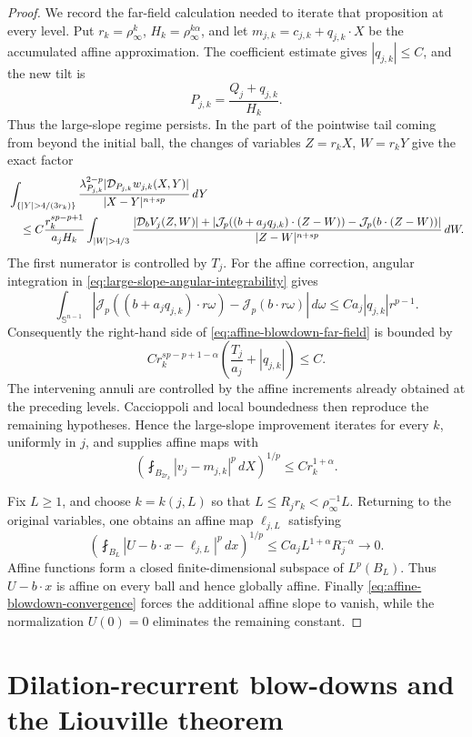 \documentclass[11pt,reqno]{amsart}
\numberwithin{equation}{section}
\newcommand{\Jp}{\mathcal J_p}
\newcommand{\dd}{\,d}
\theoremstyle{remark}
\begin{document}
\begin{proof}
We record the far-field calculation needed to iterate that proposition
at every level.  Put \(r_k=\rho_\infty^k\),
\(H_k=\rho_\infty^{k\alpha}\), and let
\(m_{j,k}=c_{j,k}+q_{j,k}\cdot X\) be the accumulated affine
approximation.  The coefficient estimate gives \(|q_{j,k}|\le C\), and
the new tilt is
\[
 P_{j,k}=\frac{Q_j+q_{j,k}}{H_k}.
\]
Thus the large-slope regime persists.  In the part of the pointwise tail
coming from beyond the initial ball, the changes of variables
\(Z=r_kX\), \(W=r_kY\) give the exact factor
\begin{align}
 &\int_{\{|Y|>4/(3r_k)\}}
 \frac{\lambda_{P_{j,k}}^{2-p}
 |\mathcal D_{P_{j,k}}w_{j,k}(X,Y)|}
 {|X-Y|^{n+sp}}\dd Y\notag\\
 &\quad\le
 C\frac{r_k^{sp-p+1}}{a_jH_k}
 \int_{|W|>4/3}
 \frac{|\mathcal D_bV_j(Z,W)|
 +|\Jp((b+a_jq_{j,k})\cdot(Z-W))
       -\Jp(b\cdot(Z-W))|}
 {|Z-W|^{n+sp}}\dd W.
 \label{eq:affine-blowdown-far-field}
\end{align}
The first numerator is controlled by \(T_j\).  For the affine correction,
angular integration in
\eqref{eq:large-slope-angular-integrability} gives
\[
 \int_{\mathbb S^{n-1}}
 |\Jp((b+a_jq_{j,k})\cdot r\omega)
 -\Jp(b\cdot r\omega)|\dd\omega
 \le Ca_j|q_{j,k}|r^{p-1}.
\]
Consequently the right-hand side of
\eqref{eq:affine-blowdown-far-field} is bounded by
\[
 Cr_k^{sp-p+1-\alpha}
 \left(\frac{T_j}{a_j}+|q_{j,k}|\right)\le C.
\]
The intervening annuli are controlled by the affine increments already
obtained at the preceding levels.  Caccioppoli and local boundedness then
reproduce the remaining hypotheses.  Hence the large-slope improvement
iterates for every \(k\), uniformly in \(j\), and supplies affine maps
with
\[
 \left(\fint_{B_{2r_k}}|v_j-m_{j,k}|^p\dd X\right)^{1/p}
 \le Cr_k^{1+\alpha}.
\]

Fix \(L\ge1\), and choose \(k=k(j,L)\) so that
\(L\le R_jr_k<\rho_\infty^{-1}L\).  Returning to the original variables,
one obtains an affine map \(\ell_{j,L}\) satisfying
\[
 \left(\fint_{B_L}
 |U-b\cdot x-\ell_{j,L}|^p\dd x\right)^{1/p}
 \le Ca_jL^{1+\alpha}R_j^{-\alpha}\longrightarrow0.
\]
Affine functions form a closed finite-dimensional subspace of
\(L^p(B_L)\).  Thus \(U-b\cdot x\) is affine on every ball and hence
globally affine.  Finally \eqref{eq:affine-blowdown-convergence} forces the
additional affine slope to vanish, while the normalization \(U(0)=0\)
eliminates the remaining constant.
\end{proof}

\section{Dilation-recurrent blow-downs and the Liouville theorem}
\label{sec:dilation-liouville}
\end{document}
